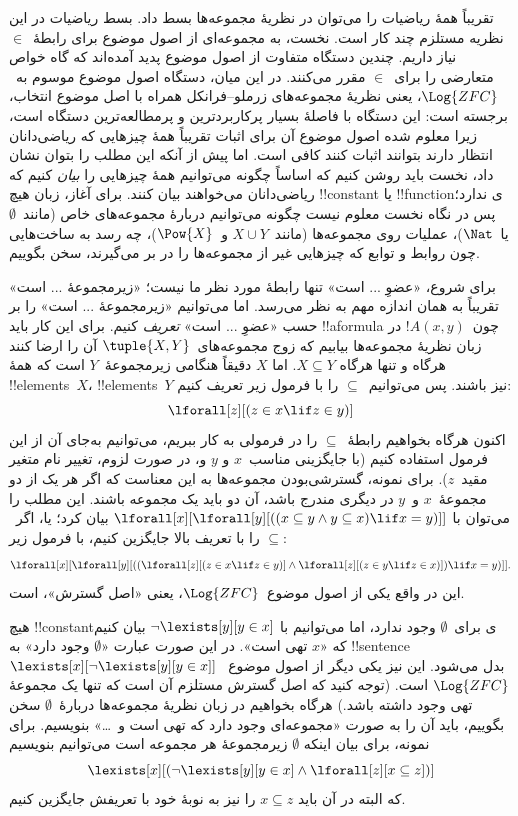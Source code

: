\documentclass[../../../include/open-logic-section]{subfiles}
\begin{document}


تقریباً همهٔ ریاضیات را می‌توان در نظریهٔ مجموعه‌ها بسط داد. بسط
ریاضیات در این نظریه مستلزم چند کار است. نخست، به مجموعه‌ای از اصول
موضوع برای رابطهٔ~$\in$ نیاز داریم. چندین دستگاه متفاوت از اصول موضوع
پدید آمده‌اند که گاه خواص متعارضی را برای~$\in$ مقرر می‌کنند. در این
میان، دستگاه اصول موضوع موسوم به~$\Log{ZFC}$، یعنی نظریهٔ مجموعه‌های
زرملو--فرانکل همراه با اصل موضوع انتخاب، برجسته است: این دستگاه با
فاصلهٔ بسیار پرکاربردترین و پرمطالعه‌ترین دستگاه است، زیرا معلوم شده
اصول موضوع آن برای اثبات تقریباً همهٔ چیزهایی که ریاضی‌دانان انتظار
دارند بتوانند اثبات کنند کافی است. اما پیش از آنکه این مطلب را بتوان
نشان داد، نخست باید روشن کنیم که اساساً چگونه می‌توانیم همهٔ چیزهایی
را \emph{بیان} کنیم که ریاضی‌دانان می‌خواهند بیان کنند. برای آغاز، زبان
هیچ !!{constant} یا !!{function}ی ندارد؛ پس در نگاه نخست معلوم نیست
چگونه می‌توانیم دربارهٔ مجموعه‌های خاص (مانند~$\emptyset$ یا~$\Nat$)،
عملیات روی مجموعه‌ها (مانند~$X \cup Y$ و~$\Pow{X}$)، چه رسد به
ساخت‌هایی چون روابط و توابع که چیزهایی غیر از مجموعه‌ها را در بر
می‌گیرند، سخن بگوییم.

برای شروع، «عضوِ ... است» تنها رابطهٔ مورد نظر ما نیست؛ «زیرمجموعهٔ
... است» تقریباً به همان اندازه مهم به نظر می‌رسد. اما می‌توانیم
«زیرمجموعهٔ ... است» را بر حسب «عضوِ ... است» \emph{تعریف} کنیم. برای
این کار باید !!a{formula} چون~$!A(x, y)$ در زبان نظریهٔ مجموعه‌ها بیابیم
که زوج مجموعه‌های~$\tuple{X, Y}$ آن را ارضا کنند هرگاه و تنها هرگاه
$X \subseteq Y$. اما $X$ دقیقاً هنگامی زیرمجموعهٔ~$Y$ است که همهٔ
!!{element}s~$X$، !!{element}s~$Y$ نیز باشند. پس می‌توانیم~$\subseteq$
را با فرمول زیر تعریف کنیم:
\[
\lforall[z][(z \in x \lif z \in y)]
\]
اکنون هرگاه بخواهیم رابطهٔ~$\subseteq$ را در فرمولی به کار ببریم،
می‌توانیم به‌جای آن از این فرمول استفاده کنیم (با جایگزینی مناسب~$x$ و
$y$ و، در صورت لزوم، تغییر نام متغیر مقید~$z$). برای نمونه، گسترشی‌بودن
مجموعه‌ها به این معناست که اگر هر یک از دو مجموعهٔ~$x$ و~$y$ در دیگری
مندرج باشد، آن دو باید یک مجموعه باشند. این مطلب را می‌توان با
$\lforall[x][\lforall[y][((x \subseteq y \land y
    \subseteq x) \lif x = y)]]$ بیان کرد؛ یا، اگر~$\subseteq$ را با
تعریف بالا جایگزین کنیم، با فرمول زیر:
\[
\lforall[x][\lforall[y][((\lforall[z][(z \in x \lif z \in y)] \land
    \lforall[z][(z \in y \lif z \in x)]) \lif x = y)]].
\]
این در واقع یکی از اصول موضوع~$\Log{ZFC}$، یعنی «اصل گسترش»، است.

هیچ !!{constant}ی برای~$\emptyset$ وجود ندارد، اما می‌توانیم با
$\lnot \lexists[y][y \in x]$ بیان کنیم که «$x$ تهی است». در این صورت
عبارت «$\emptyset$ وجود دارد» به !!{sentence}
~$\lexists[x][\lnot \lexists[y][y \in x]]$ بدل می‌شود. این نیز یکی دیگر
از اصول موضوع~$\Log{ZFC}$ است. (توجه کنید که اصل گسترش مستلزم آن است که
تنها یک مجموعهٔ تهی وجود داشته باشد.) هرگاه بخواهیم در زبان نظریهٔ
مجموعه‌ها دربارهٔ~$\emptyset$ سخن بگوییم، باید آن را به صورت «مجموعه‌ای
وجود دارد که تهی است و~\dots» بنویسیم. برای نمونه، برای بیان اینکه
$\emptyset$ زیرمجموعهٔ هر مجموعه است می‌توانیم بنویسیم
\[
\lexists[x][(\lnot\lexists[y][y \in x] \land \lforall[z][x \subseteq
    z])]
\]
که البته در آن باید $x \subseteq z$ را نیز به نوبهٔ خود با تعریفش
جایگزین کنیم.
\end{document}
